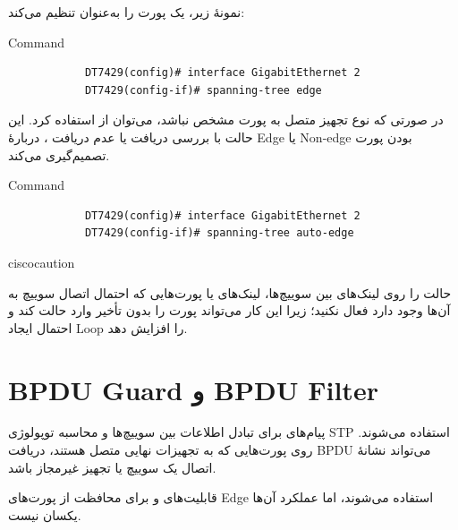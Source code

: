 \documentclass[11pt,letterpaper]{report}
\newenvironment{cautionbox}[1]{%
	\begin{noticebox}[title={\textbf{\faExclamationTriangle\ #1}}]{ciscocaution}
	}{%
	\end{noticebox}
}
\begin{document}
	نمونهٔ زیر، یک پورت را به‌عنوان  تنظیم می‌کند:

	\begin{latin}
		\begin{cliexample}{Command}
			\begin{verbatim}
			DT7429(config)# interface GigabitEthernet 2
			DT7429(config-if)# spanning-tree edge
			\end{verbatim}
		\end{cliexample}
	\end{latin}

	در صورتی که نوع تجهیز متصل به پورت مشخص نباشد، می‌توان از
	 استفاده کرد. این حالت با بررسی دریافت یا عدم دریافت
	، دربارهٔ Edge یا Non-edge بودن پورت تصمیم‌گیری می‌کند.

	\begin{latin}
		\begin{cliexample}{Command}
			\begin{verbatim}
			DT7429(config)# interface GigabitEthernet 2
			DT7429(config-if)# spanning-tree auto-edge
			\end{verbatim}
		\end{cliexample}
	\end{latin}

	\begin{cautionbox}{هشدار}
		حالت  را روی لینک‌های بین سوییچ‌ها، لینک‌های
		 یا پورت‌هایی که احتمال اتصال سوییچ به آن‌ها وجود دارد
		فعال نکنید؛ زیرا این کار می‌تواند پورت را بدون تأخیر وارد حالت
		 کند و احتمال ایجاد Loop را افزایش دهد.
	\end{cautionbox}


	\section{BPDU Guard و BPDU Filter}

	پیام‌های  برای تبادل اطلاعات
	بین سوییچ‌ها و محاسبه توپولوژی STP استفاده می‌شوند. روی پورت‌هایی
	که به تجهیزات نهایی متصل هستند، دریافت BPDU می‌تواند نشانهٔ اتصال
	یک سوییچ یا تجهیز غیرمجاز باشد.

	قابلیت‌های  و  برای محافظت از
	پورت‌های Edge استفاده می‌شوند، اما عملکرد آن‌ها یکسان نیست.
\end{document}
